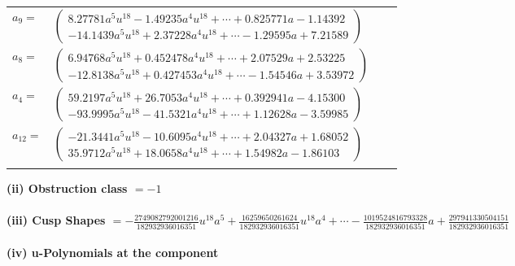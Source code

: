 \documentclass[1p]{elsarticle_modified}
\theoremstyle{definition}
\begin{document}
\begin{tabular}{m{7pt} m{180pt} m{7pt} m{180pt} }
\flushright $a_{9}=$&$\begin{pmatrix}8.27781 a^{5} u^{18}-1.49235 a^{4} u^{18}+\cdots+0.825771 a-1.14392\\-14.1439 a^{5} u^{18}+2.37228 a^{4} u^{18}+\cdots-1.29595 a+7.21589\end{pmatrix}$ \\
\flushright $a_{8}=$&$\begin{pmatrix}6.94768 a^{5} u^{18}+0.452478 a^{4} u^{18}+\cdots+2.07529 a+2.53225\\-12.8138 a^{5} u^{18}+0.427453 a^{4} u^{18}+\cdots-1.54546 a+3.53972\end{pmatrix}$ \\
\flushright $a_{4}=$&$\begin{pmatrix}59.2197 a^{5} u^{18}+26.7053 a^{4} u^{18}+\cdots+0.392941 a-4.15300\\-93.9995 a^{5} u^{18}-41.5321 a^{4} u^{18}+\cdots+1.12628 a-3.59985\end{pmatrix}$ \\
\flushright $a_{12}=$&$\begin{pmatrix}-21.3441 a^{5} u^{18}-10.6095 a^{4} u^{18}+\cdots+2.04327 a+1.68052\\35.9712 a^{5} u^{18}+18.0658 a^{4} u^{18}+\cdots+1.54982 a-1.86103\end{pmatrix}$\\&\end{tabular}
\flushleft \textbf{(ii) Obstruction class $= -1$}\\~\\
\flushleft \textbf{(iii) Cusp Shapes $= -\frac{2749082792001216}{182932936016351} u^{18} a^5+\frac{16259650261624}{182932936016351} u^{18} a^4+\cdots-\frac{1019524816793328}{182932936016351} a+\frac{297941330504151}{182932936016351}$}\\~\\
\newpage\renewcommand{\arraystretch}{1}
\flushleft \textbf{(iv) u-Polynomials at the component}\newline \\
\end{document}
